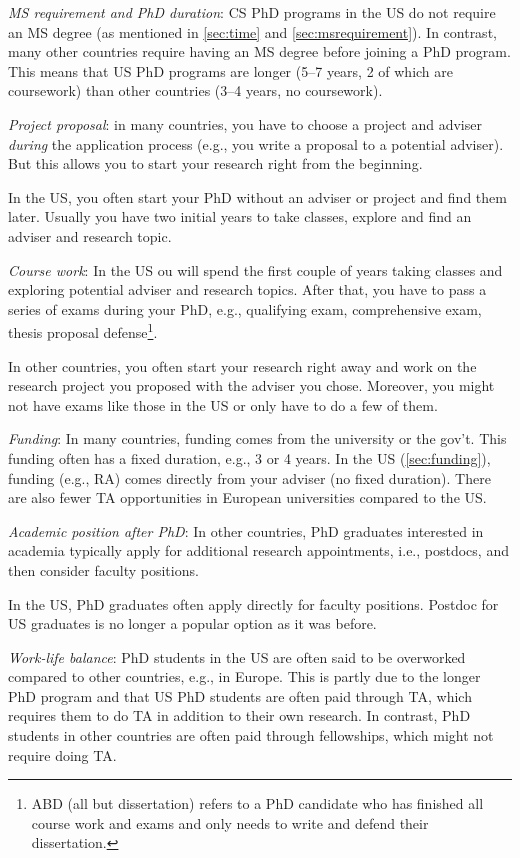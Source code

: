 \documentclass[oneside,11pt,dvipsnames]{book}
\begin{document}
\emph{MS requirement and PhD duration}:  CS PhD programs in the US do not require an MS degree (as mentioned in \autoref{sec:time} and \autoref{sec:msrequirement}).  In contrast, many other countries require having an MS degree before joining a PhD program.  This means that US PhD programs are longer (5--7 years, 2 of which are coursework) than other countries (3--4 years, no coursework).

\emph{Project proposal}: in many countries, you have to choose a project and adviser \emph{during} the application process (e.g., you write a proposal to a potential adviser). But this allows you to start your research right from the beginning. 

In the US, you often start your PhD without an adviser or project and find them later. Usually you have two initial years to take classes, explore and find an adviser and research topic. 

\emph{Course work}: In the US ou will spend the first couple of years taking classes and exploring potential adviser and research topics. 
After that, you have to pass a series of exams during your PhD, e.g., qualifying exam, comprehensive exam, thesis proposal defense\footnote{ABD (all but dissertation) refers to a PhD candidate who has finished all course work and exams and only needs to write and defend their dissertation.}.

In other countries, you often start your research right away and work on the research project you proposed with the adviser you chose. Moreover, you might not have exams like those in the US or only have to do a few of them.

\emph{Funding}:  In many countries, funding comes from the university or the gov't. This funding often has a fixed duration, e.g., 3 or 4 years.  In the US (\autoref{sec:funding}), funding (e.g., RA) comes directly from your adviser (no fixed duration).  There are also fewer TA opportunities in European universities compared to the US.

\emph{Academic position after PhD}: In other countries, PhD graduates interested in academia typically apply for additional research appointments, i.e., postdocs, and then consider faculty positions. 

In the US, PhD graduates often apply directly for faculty positions. Postdoc for US graduates is no longer a popular option as it was before.

\emph{Work-life balance}: PhD students in the US are often said to be overworked compared to other countries, e.g., in Europe.  This is partly due to the longer PhD program and that US PhD students are often paid through TA, which requires them to do TA in addition to their own research. In contrast, PhD students in other countries are often paid through fellowships, which might not require doing TA.
\end{document}
